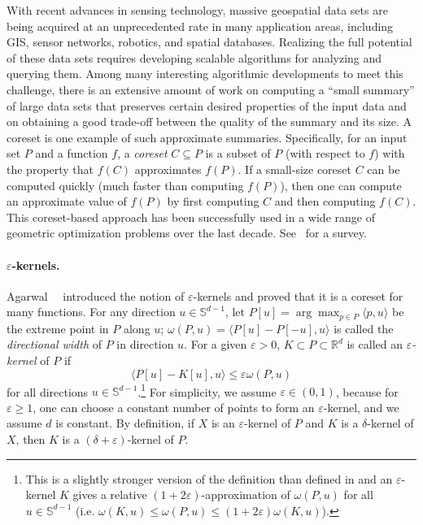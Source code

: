 \documentclass[11pt]{myclass}
\newcommand{\eps}{\varepsilon}
\renewcommand{\b}[1]{\ensuremath{\mathbb{#1}}}
\newcommand{\IP}[2]{\ensuremath{ \langle #1 , #2 \rangle}}
\newcommand{\wid}{\omega}
\begin{document}
With recent advances in sensing technology, massive geospatial
data sets are being acquired at an unprecedented rate in many application
areas, including GIS, sensor networks, robotics, and spatial databases. Realizing the full potential of these data 
sets requires developing scalable algorithms for 
analyzing and querying them.  Among many interesting
algorithmic developments to meet this challenge,  there is an
extensive amount of work on computing a ``small summary'' of large 
data sets that preserves certain desired properties of the input data 
and on obtaining a good trade-off between the quality of the summary
and its size.  A coreset is one example of such approximate summaries.
Specifically, for an input set $P$ and a function $f$, 
a \emph{coreset} $C \subseteq P$ is a subset of $P$ (with respect to $f$)
with the property that $f(C)$ approximates $f(P)$. If a small-size coreset
$C$ can be computed quickly (much faster than computing $f(P)$), then 
one can compute an approximate value of $f(P)$ by first
computing $C$ and then computing $f(C)$. This 
coreset-based approach has been successfully used in a wide range of 
geometric optimization problems over the last decade.  See~\cite{AHV07} for a survey.



\paragraph{$\eps$-kernels.} Agarwal~\etal~\cite{AHV04} introduced the notion
of $\eps$-kernels and proved that it is a coreset for many functions.
For any direction $u \in \b{S}^{d-1}$, let 
$P[u] = \arg \max_{p \in P} \IP{p}{u}$ be the extreme point in $P$ 
along $u$;  $\wid(P,u) = \IP{P[u] - P[-u]}{u}$ is called 
the \emph{directional width} of $P$ in direction $u$.  
For a given $\eps>0$, $K \subset P \subset \b{R}^d$ is called 
an \emph{$\eps$-kernel} of $P$ if 
$$
\IP{P[u] - K[u]}{u} \leq \eps \wid(P,u)
$$
for all directions $u \in \b{S}^{d-1}$.\footnote{This is a slightly stronger version of the definition than defined in 
\cite{AHV04} and an $\eps$-kernel $K$ gives a relative $(1+2\eps)$-approximation of $\wid(P,u)$ for all $u \in \b{S}^{d-1}$ (i.e. $\wid(K, u) \leq \wid(P,u) \leq (1+2\eps) \wid(K,u)$).}
For simplicity, we assume $\eps \in (0, 1)$, because for $\eps \geq 1$, 
one can choose a constant number of points to form an $\eps$-kernel, and we assume $d$ is constant.  
By definition, if $X$ is an $\eps$-kernel of $P$ and $K$ is a $\delta$-kernel
of $X$, then $K$ is a $(\delta+\eps)$-kernel of $P$. 
\end{document}
